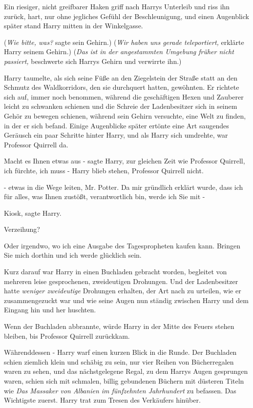 Ein riesiger, nicht greifbarer Haken griff nach Harrys Unterleib und riss ihn
zurück, hart, nur ohne jegliches Gefühl der Beschleunigung, und einen Augenblick
später stand Harry mitten in der Winkelgasse.

(\emph{Wie bitte, was?} sagte sein Gehirn.) (\emph{Wir haben uns gerade
teleportiert,} erklärte Harry seinem Gehirn.) (\emph{Das ist in der angestammten
Umgebung früher nicht passiert,} beschwerte sich Harrys Gehirn und verwirrte
ihn.)

Harry taumelte, als sich seine Füße an den Ziegelstein der Straße statt an den
Schmutz des Waldkorridors, den sie durchquert hatten, gewöhnten. Er richtete
sich auf, immer noch benommen, während die geschäftigen Hexen und Zauberer
leicht zu schwanken schienen und die Schreie der Ladenbesitzer sich in seinem
Gehör zu bewegen schienen, während sein Gehirn versuchte, eine Welt zu finden,
in der er sich befand. Einige Augenblicke später ertönte eine Art saugendes
Geräusch ein paar Schritte hinter Harry, und als Harry sich umdrehte, war
Professor Quirrell da.

\glqq Macht es Ihnen etwas aus -\grqq{} sagte Harry, zur gleichen Zeit wie
Professor Quirrell, \glqq ich fürchte, ich muss -\grqq{} Harry blieb stehen,
Professor Quirrell nicht.

\glqq - etwas in die Wege leiten, Mr. Potter. Da mir gründlich erklärt wurde,
dass ich für alles, was Ihnen zustößt, verantwortlich bin, werde ich Sie mit
-\grqq{}

\glqq Kiosk\grqq{}, sagte Harry.

\glqq Verzeihung?\grqq{}

\glqq Oder irgendwo, wo ich eine Ausgabe des Tagespropheten kaufen kann. Bringen
Sie mich dorthin und ich werde glücklich sein.\grqq{}

Kurz darauf war Harry in einen Buchladen gebracht worden, begleitet von mehreren
leise gesprochenen, zweideutigen Drohungen. Und der Ladenbesitzer hatte
\emph{weniger zweideutige }Drohungen erhalten, der Art nach zu urteilen, wie er
zusammengezuckt war und wie seine Augen nun ständig zwischen Harry und dem
Eingang hin und her huschten.

Wenn der Buchladen abbrannte, würde Harry in der Mitte des Feuers stehen
bleiben, bis Professor Quirrell zurückkam.

Währenddessen - Harry warf einen kurzen Blick in die Runde. Der Buchladen schien
ziemlich klein und schäbig zu sein, nur vier Reihen von Bücherregalen waren zu
sehen, und das nächstgelegene Regal, zu dem Harrys Augen gesprungen waren,
schien sich mit schmalen, billig gebundenen Büchern mit düsteren Titeln wie
\emph{Das Massaker von Albanien im fünfzehnten Jahrhundert} zu befassen. Das
Wichtigste zuerst. Harry trat zum Tresen des Verkäufers hinüber.

